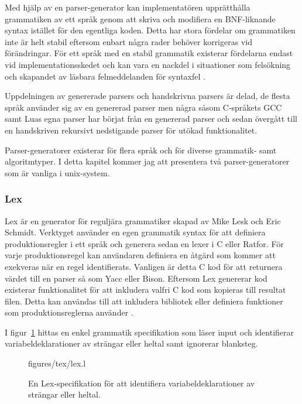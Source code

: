 Med hjälp av en parser-generator kan implementatören upprätthålla grammatiken
av ett språk genom att skriva och modifiera en BNF-liknande syntax istället
för den egentliga koden. Detta har stora fördelar om grammatiken inte är helt
stabil eftersom enbart några rader behöver korrigeras vid förändringar. För
ett språk med en stabil grammatik existerar fördelarna endast vid
implementationsskedet och kan vara en nackdel i situationer som felsökning och
skapandet av läsbara felmeddelanden för syntaxfel \citep[s. 175]{bf09}.

Uppdelningen av genererade parsers och handskrivna parsers är delad, de flesta
språk använder sig av en genererad parser men några såsom C-språkets GCC \citep{gcc}
samt Luas egna parser \citep{luaimp} har börjat från en genererad parser och
sedan övergått till en handskriven rekursivt nedstigande parser för utökad
funktionalitet.

Parser-generatorer existerar för flera språk och för diverse grammatik- samt
algoritmtyper. I detta kapitel kommer jag att presentera två
parser-generatorer som är vanliga i unix-system.

\subsubsection{Lex}

Lex är en generator för reguljära grammatiker skapad av Mike Lesk och
Eric Schmidt. Verktyget använder en egen grammatik syntax för att
definiera produktionsregler i ett språk och generera sedan en lexer i C eller
Ratfor. För varje produktionsregel kan användaren definiera en åtgärd som
kommer att exekveras när en regel identifierats. Vanligen är detta C kod för
att returnera värdet till en parser så som Yacc eller Bison. Eftersom Lex
genererar kod existerar funktionalitet för att inkludera valfri C kod som
kopieras till resultat filen. Detta kan användas till att inkludera bibliotek
eller definiera funktioner som produktionsreglerna använder \citep{lex}.

I figur~\ref{fig:lex} hittas en enkel grammatik specifikation som läser input
och identifierar variabeldeklarationer av strängar eller heltal samt ignorerar
blanksteg.

\begin{figure}[ht]
    {figures/tex/lex.l}
  \caption{En Lex-specifikation för att identifiera variabeldeklarationer av
    strängar eller heltal.}
  \label{fig:lex}
\end{figure}

